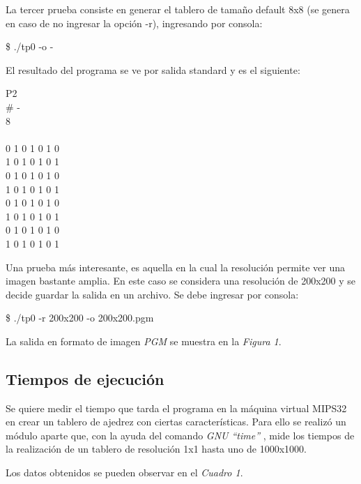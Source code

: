 \documentclass{article}
\begin{document}
	La tercer prueba consiste en generar el tablero de tamaño default 8x8 (se genera en caso de no ingresar la opción -r), ingresando por consola:
	\bigskip

{\ttfamily\footnotesize
\indent \$ ./tp0 -o -\\}
\smallskip

	El resultado del programa se ve por salida standard y es el siguiente:
	\bigskip

{\ttfamily\footnotesize
	\indent P2 \\
	\indent \# - \\
	 8 \\
	 \\
	 0 1 0 1 0 1 0 \\
	 1 0 1 0 1 0 1 \\
	 0 1 0 1 0 1 0 \\
	 1 0 1 0 1 0 1 \\
	 0 1 0 1 0 1 0 \\
	 1 0 1 0 1 0 1 \\
	 0 1 0 1 0 1 0 \\
	 1 0 1 0 1 0 1 \\
}
\bigskip


	Una prueba más interesante, es aquella en la cual la resolución permite ver una imagen bastante amplia. En este caso se considera una resolución de 200x200 y se decide guardar la salida en un archivo. Se debe ingresar por consola:
	\bigskip

{\ttfamily\footnotesize
\indent \$ ./tp0 -r 200x200 -o 200x200.pgm\\}
\smallskip

	La salida en formato de imagen \textit{PGM} se muestra en la \textit{Figura 1}.


\newpage


\subsection{Tiempos de ejecución}

	\par
	Se quiere medir el tiempo que tarda el programa en la máquina virtual MIPS32 en crear un tablero de ajedrez con ciertas características. Para ello se realizó un módulo aparte que, con la ayuda del comando \textit{GNU ``time''} \cite{TIME}, mide los tiempos de la realización de un tablero de resolución 1x1 hasta uno de 1000x1000. 
	\par
	Los datos obtenidos se pueden observar en el \textit{Cuadro 1}. 
	\bigskip\bigskip
\end{document}
